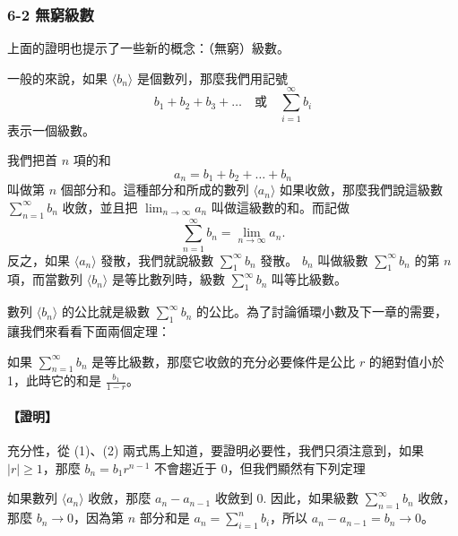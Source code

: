 \subsubsection*{6-2 無窮級數}

上面的證明也提示了一些新的概念：（無窮）級數。

一般的來說，如果 $\langle b_n \rangle$ 是個數列，那麼我們用記號
\[
b_1+b_2+b_3+\dots \quad \text{或} \quad \sum_{i=1}^\infty b_i
\]
表示一個級數。

我們把首 $n$ 項的和
\[
a_n = b_1+b_2+\dots+b_n
\]
叫做第 $n$ 個部分和。這種部分和所成的數列 $\langle a_n \rangle$ 如果收斂，那麼我們說這級數 $\sum_{n=1}^\infty b_n$ 收斂，並且把 $\lim_{n\to\infty} a_n$ 叫做這級數的和。而記做
\[
\sum_{n=1}^\infty b_n = \lim_{n\to\infty} a_n.
\]
反之，如果 $\langle a_n \rangle$ 發散，我們就說級數 $\sum_1^\infty b_n$ 發散。 $b_n$ 叫做級數 $\sum_1^\infty b_n$ 的第 $n$ 項，而當數列 $\langle b_n \rangle$ 是等比數列時，級數 $\sum_1^\infty b_n$ 叫等比級數。

數列 $\langle b_n \rangle$ 的公比就是級數 $\sum_1^\infty b_n$ 的公比。為了討論循環小數及下一章的需要，讓我們來看看下面兩個定理：

\begin{theorem}\label{thm:b2_2-6-1}
如果 $\sum_{n=1}^\infty b_n$ 是等比級數，那麼它收斂的充分必要條件是公比 $r$ 的絕對值小於 1，此時它的和是 $\frac{b_1}{1-r}$。
\end{theorem}
\paragraph{【證明】} 充分性，從 (1)、(2) 兩式馬上知道，要證明必要性，我們只須注意到，如果 $|r| \ge 1$，那麼 $b_n = b_1 r^{n-1}$ 不會趨近于 0，但我們顯然有下列定理

\begin{theorem}\label{thm:b2_2-6-2}
如果數列 $\langle a_n \rangle$ 收斂，那麼 $a_n - a_{n-1}$ 收斂到 0. 因此，如果級數 $\sum_{n=1}^\infty b_n$ 收斂，那麼 $b_n \to 0$，因為第 $n$ 部分和是 $a_n = \sum_{i=1}^n b_i$，所以 $a_n - a_{n-1} = b_n \to 0$。
\end{theorem}

